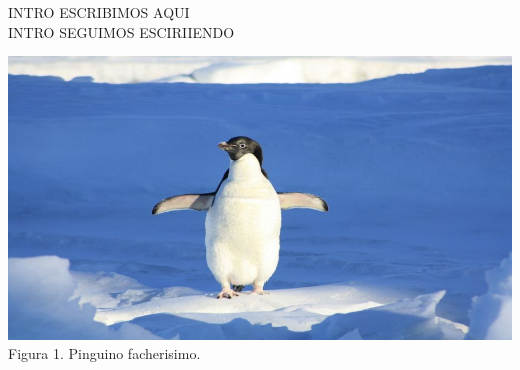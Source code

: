 INTRO ESCRIBIMOS AQUI \\
INTRO SEGUIMOS ESCIRIIENDO

\begin{center}
    \includegraphics[scale=0.5, width=\textwidth]{Z-Imagenes/pinguino1.jpg}\\
    Figura 1. Pinguino facherisimo.
\end{center} 

